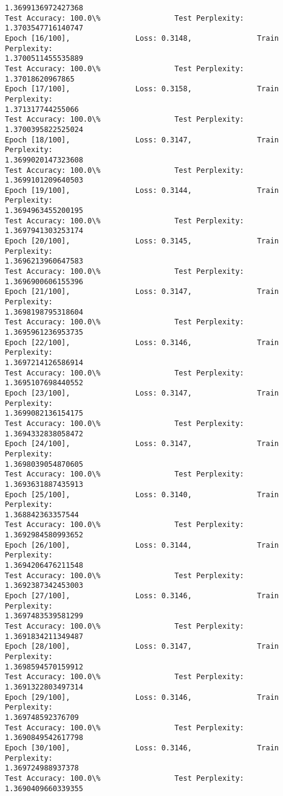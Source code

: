 \documentclass[11pt]{article}
\begin{document}
\begin{Verbatim}[commandchars=\\\{\}]
1.3699136972427368
Test Accuracy: 100.0\%                 Test Perplexity: 1.3703547716140747
Epoch [16/100],               Loss: 0.3148,               Train Perplexity:
1.3700511455535889
Test Accuracy: 100.0\%                 Test Perplexity: 1.37018620967865
Epoch [17/100],               Loss: 0.3158,               Train Perplexity:
1.371317744255066
Test Accuracy: 100.0\%                 Test Perplexity: 1.3700395822525024
Epoch [18/100],               Loss: 0.3147,               Train Perplexity:
1.3699020147323608
Test Accuracy: 100.0\%                 Test Perplexity: 1.3699101209640503
Epoch [19/100],               Loss: 0.3144,               Train Perplexity:
1.3694963455200195
Test Accuracy: 100.0\%                 Test Perplexity: 1.3697941303253174
Epoch [20/100],               Loss: 0.3145,               Train Perplexity:
1.3696213960647583
Test Accuracy: 100.0\%                 Test Perplexity: 1.3696900606155396
Epoch [21/100],               Loss: 0.3147,               Train Perplexity:
1.3698198795318604
Test Accuracy: 100.0\%                 Test Perplexity: 1.3695961236953735
Epoch [22/100],               Loss: 0.3146,               Train Perplexity:
1.3697214126586914
Test Accuracy: 100.0\%                 Test Perplexity: 1.3695107698440552
Epoch [23/100],               Loss: 0.3147,               Train Perplexity:
1.3699082136154175
Test Accuracy: 100.0\%                 Test Perplexity: 1.3694332838058472
Epoch [24/100],               Loss: 0.3147,               Train Perplexity:
1.3698039054870605
Test Accuracy: 100.0\%                 Test Perplexity: 1.3693631887435913
Epoch [25/100],               Loss: 0.3140,               Train Perplexity:
1.368842363357544
Test Accuracy: 100.0\%                 Test Perplexity: 1.3692984580993652
Epoch [26/100],               Loss: 0.3144,               Train Perplexity:
1.3694206476211548
Test Accuracy: 100.0\%                 Test Perplexity: 1.3692387342453003
Epoch [27/100],               Loss: 0.3146,               Train Perplexity:
1.3697483539581299
Test Accuracy: 100.0\%                 Test Perplexity: 1.3691834211349487
Epoch [28/100],               Loss: 0.3147,               Train Perplexity:
1.3698594570159912
Test Accuracy: 100.0\%                 Test Perplexity: 1.3691322803497314
Epoch [29/100],               Loss: 0.3146,               Train Perplexity:
1.369748592376709
Test Accuracy: 100.0\%                 Test Perplexity: 1.3690849542617798
Epoch [30/100],               Loss: 0.3146,               Train Perplexity:
1.369724988937378
Test Accuracy: 100.0\%                 Test Perplexity: 1.3690409660339355

\end{Verbatim}
\end{document}
